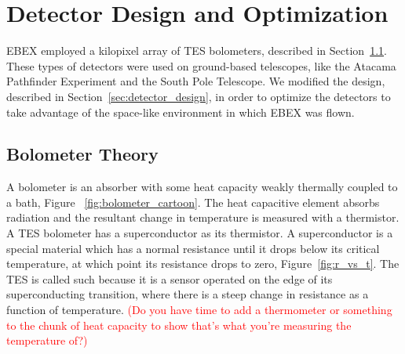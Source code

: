 \chapter{Detector Design and Optimization}
\label{sec:optimization_chapter}

\ac{EBEX} employed a kilopixel array of \ac{TES} bolometers, described in Section~\ref{sec:tes_bolometer}. 
These types of detectors were used on ground-based telescopes, like the Atacama Pathfinder Experiment and the South Pole Telescope. 
We modified the design, described in Section~\ref{sec:detector_design}, in order to optimize the detectors to take advantage of the space-like environment in which \ac{EBEX} was flown.


\section{Bolometer Theory}
\label{sec:tes_bolometer}




A bolometer is an absorber with some heat capacity weakly thermally coupled to a bath, Figure ~\ref{fig:bolometer_cartoon}. 
The heat capacitive element absorbs radiation and the resultant change in temperature is measured with a thermistor.  
A \ac{TES} bolometer has a superconductor as its thermistor. 
A superconductor is a special material which has a normal resistance until it drops below its critical temperature, at which point its resistance drops to zero, Figure~\ref{fig:r_vs_t}. 
The \ac{TES} is called such because it is a sensor operated on the edge of its superconducting transition, where there is a steep change in resistance as a function of temperature. 
\textcolor{red}{(Do you have time to add a thermometer or something to the chunk of heat capacity to show that's what you're measuring the temperature of?)}

